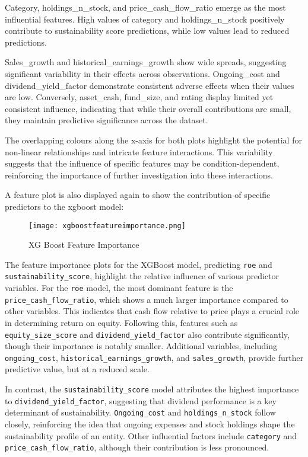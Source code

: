 Category, holdings\_n\_stock, and price\_cash\_flow\_ratio emerge as the most influential features. High values of category and holdings\_n\_stock positively contribute to sustainability score predictions, while low values lead to reduced predictions.

Sales\_growth and historical\_earnings\_growth show wide spreads, suggesting significant variability in their effects across observations. Ongoing\_cost and dividend\_yield\_factor demonstrate consistent adverse effects when their values are low. Conversely, asset\_cash, fund\_size, and rating display limited yet consistent influence, indicating that while their overall contributions are small, they maintain predictive significance across the dataset.

The overlapping colours along the x-axis for both plots highlight the potential for non-linear relationships and intricate feature interactions. This variability suggests that the influence of specific features may be condition-dependent, reinforcing the importance of further investigation into these interactions.

A feature plot is also displayed again to show the contribution of specific predictors to the xgboost model:

\begin{figure}[H]
    \centering
    \texttt{[image: xgboostfeatureimportance.png]}
    \caption{XG Boost Feature Importance}
    \label{fig:xgboostfeatureimportance}
\end{figure}

\noindent The feature importance plots for the XGBoost model, predicting \texttt{roe} and \texttt{sustainability\linebreak \_score}, highlight the relative influence of various predictor variables. For the \texttt{roe} model, the most dominant feature is the \texttt{price\_cash\_flow\_ratio}, which shows a much larger importance compared to other variables. This indicates that cash flow relative to price plays a crucial role in determining return on equity. Following this, features such as \texttt{equity\_size\_score} and \texttt{dividend\_yield\_factor} also contribute significantly, though their importance is notably smaller. Additional variables, including \texttt{ongoing\_cost}, \linebreak \texttt{historical\_earnings\_growth}, and \texttt{sales\_growth}, provide further predictive value, but at a reduced scale.

In contrast, the \texttt{sustainability\_score} model attributes the highest importance to \texttt{dividend\_yield\_factor}, suggesting that dividend performance is a key determinant of sustainability. \texttt{Ongoing\_cost} and \texttt{holdings\_n\_stock} follow closely, reinforcing the idea that ongoing expenses and stock holdings shape the sustainability profile of an entity. Other influential factors include \texttt{category} and \texttt{price\_cash\_flow\_ratio}, although their contribution is less pronounced. 

